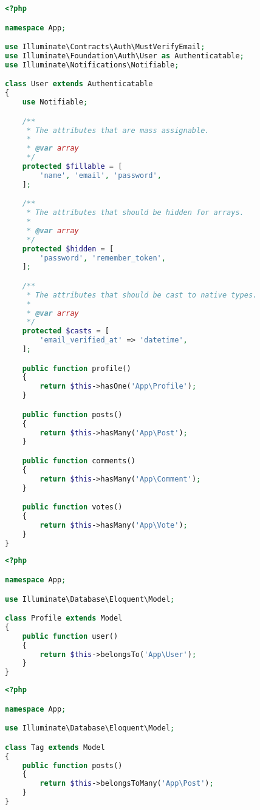 \documentclass[11pt, oneside]{article}   	%
\begin{document}
\begin{lstlisting}[showstringspaces=false, title=User.java, language=PHP, frame=single]
<?php

namespace App;

use Illuminate\Contracts\Auth\MustVerifyEmail;
use Illuminate\Foundation\Auth\User as Authenticatable;
use Illuminate\Notifications\Notifiable;

class User extends Authenticatable
{
    use Notifiable;

    /**
     * The attributes that are mass assignable.
     *
     * @var array
     */
    protected $fillable = [
        'name', 'email', 'password',
    ];

    /**
     * The attributes that should be hidden for arrays.
     *
     * @var array
     */
    protected $hidden = [
        'password', 'remember_token',
    ];

    /**
     * The attributes that should be cast to native types.
     *
     * @var array
     */
    protected $casts = [
        'email_verified_at' => 'datetime',
    ];

    public function profile()
    {
        return $this->hasOne('App\Profile');
    }

    public function posts()
    {
        return $this->hasMany('App\Post');
    }

    public function comments()
    {
        return $this->hasMany('App\Comment');
    }

    public function votes()
    {
        return $this->hasMany('App\Vote');
    }
}
\end{lstlisting}

\begin{lstlisting}[showstringspaces=false, title=Profile.java, language=PHP, frame=single]
<?php

namespace App;

use Illuminate\Database\Eloquent\Model;

class Profile extends Model
{
    public function user()
    {
        return $this->belongsTo('App\User');
    }
}
\end{lstlisting}

\begin{lstlisting}[showstringspaces=false, title=Tag.java, language=PHP, frame=single]
<?php

namespace App;

use Illuminate\Database\Eloquent\Model;

class Tag extends Model
{
    public function posts()
    {
        return $this->belongsToMany('App\Post');
    }
}
\end{lstlisting}
\end{document}
